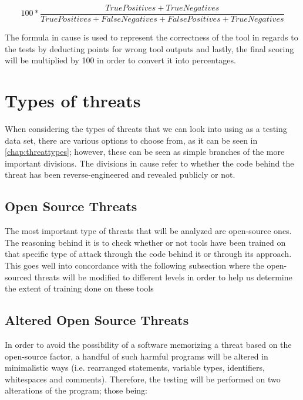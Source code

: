 \begin{equation}
100 * \frac{True Positives + True Negatives}{True Positives + False Negatives + False Positives + True Negatives}    
\end{equation}\newline

\noindent The formula in cause is used to represent the correctness of the tool in regards to the tests by deducting points for wrong tool outputs and lastly, the final scoring will be multiplied by 100 in order to convert it into percentages.

\section{Types of threats}

When considering the types of threats that we can look into using as a testing data set, there are various options to choose from, as it can be seen in \autoref{chap:threattypes}; however, these can be seen as simple branches of the more important divisions. The divisions in cause refer to whether the code behind the threat has been reverse-engineered and revealed publicly or not.

\subsection{Open Source Threats}

The most important type of threats that will be analyzed are open-source ones. The reasoning behind it is to check whether or not tools have been trained on that specific type of attack through the code behind it or through its approach. This goes well into concordance with the following subsection where the open-sourced threats will be modified to different levels in order to help us determine the extent of training done on these tools

\subsection{Altered Open Source Threats}

In order to avoid the possibility of a software memorizing a threat based on the open-source factor, a handful of such harmful programs will be altered in minimalistic ways (i.e. rearranged statements, variable types, identifiers, whitespaces and comments). Therefore, the testing will be performed on two alterations of the program; those being:


